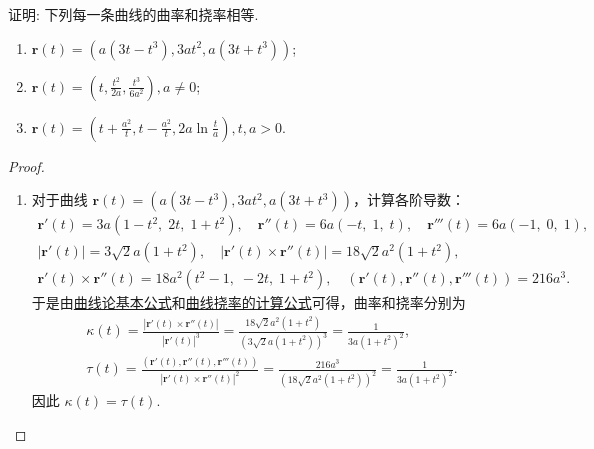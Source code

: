 \documentclass[../../main.tex]{subfiles}%
\begin{document}
\begin{example}
证明: 下列每一条曲线的曲率和挠率相等.
\begin{enumerate}[(1)]
\item $\bm{r}(t) = \left(a(3t - t^3), 3at^2, a(3t + t^3)\right)$;
\item $\bm{r}(t) = \left(t, \frac{t^2}{2a}, \frac{t^3}{6a^2}\right), a \neq 0$;
\item $\bm{r}(t) = \left(t + \frac{a^2}{t}, t - \frac{a^2}{t}, 2a \ln \frac{t}{a}\right), t, a > 0$.
\end{enumerate}
\end{example}
\begin{proof}
\begin{enumerate}[(1)]
\item 对于曲线 $\bm{r}(t) = \left(a(3t - t^3), 3at^2, a(3t + t^3)\right)$，计算各阶导数：
\begin{gather*}
\boldsymbol{r}'(t)=3a\left(1-t^2,\;2t,\;1+t^2\right),\quad
\boldsymbol{r}''(t)=6a\left(-t,\;1,\;t\right),\quad
\boldsymbol{r}'''(t)=6a\left(-1,\;0,\;1\right),\\
\left|\boldsymbol{r}'(t)\right|=3\sqrt{2}a(1+t^2),\quad
\left|\boldsymbol{r}'(t)\times\boldsymbol{r}''(t)\right|=18\sqrt{2}a^2(1+t^2),\\
\boldsymbol{r}'(t)\times\boldsymbol{r}''(t)=18a^2\left(t^2-1,\;-2t,\;1+t^2\right),\quad
(\boldsymbol{r}'(t),\boldsymbol{r}''(t),\boldsymbol{r}'''(t))=216a^3.
\end{gather*}
于是由\hyperref[theorem:曲线论基本公式]{曲线论基本公式}和\hyperref[theorem:微分几何-曲线挠率的计算公式]{曲线挠率的计算公式}可得，曲率和挠率分别为
\begin{gather*}
\kappa(t)=\frac{\left|\boldsymbol{r}'(t)\times\boldsymbol{r}''(t)\right|}{\left|\boldsymbol{r}'(t)\right|^3}
= \frac{18\sqrt{2}a^2(1+t^2)}{\left(3\sqrt{2}a(1+t^2)\right)^3}
= \frac{1}{3a(1+t^2)^2},\\
\tau(t)=\frac{(\boldsymbol{r}'(t),\boldsymbol{r}''(t),\boldsymbol{r}'''(t))}{\left|\boldsymbol{r}'(t)\times\boldsymbol{r}''(t)\right|^2}
= \frac{216a^3}{\left(18\sqrt{2}a^2(1+t^2)\right)^2}
= \frac{1}{3a(1+t^2)^2}.
\end{gather*}
因此 $\kappa(t)=\tau(t)$.


\end{enumerate}
\end{proof}
\end{document}
